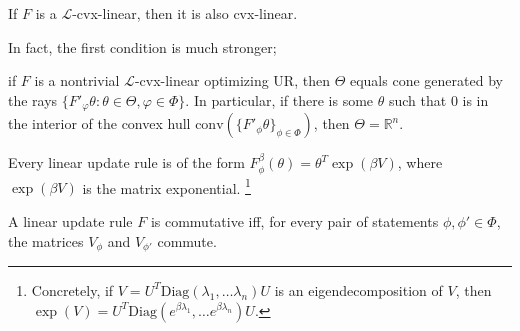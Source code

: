 \begin{prop}
If $F$ is a $\mathcal L$-cvx-linear, then it is also cvx-linear.
\end{prop}

In fact, the first condition is much stronger;
\begin{prop}
if $F$ is a nontrivial $\mathcal L$-cvx-linear optimizing UR, then $\Theta$ equals cone generated by  the rays $\{ F'_\varphi\theta : \theta \in \Theta, \varphi \in \Phi \}$. In particular, if there is some $\theta$ such that $0$ is in the interior of the convex hull $\mathrm{conv}(\{F'_\phi\theta\}_{\phi \in \Phi})$, then $\Theta = \mathbb R^n$.
\end{prop}


\begin{prop}
Every linear update rule is of the form
$
    F^{\beta}_\phi(\theta) =  \theta^{T} \exp(\beta V)
$,
where $\exp(\beta V)$ is the matrix exponential.%
    \footnote{Concretely, if $V = U^T \mathrm{Diag}(\lambda_1, \ldots \lambda_n) U$ is an eigendecomposition of $V$, then $\exp(V) = U^T \mathrm{Diag}(e^{\beta\lambda_1}, \ldots e^{\beta\lambda_n}) U$.}
\end{prop}

\begin{prop}
A linear update rule $F$ is commutative iff, for every pair of statements  $\phi, \phi' \in \Phi$, the
matrices $V_\phi$ and $V_{\phi'}$ commute.
\end{prop}
